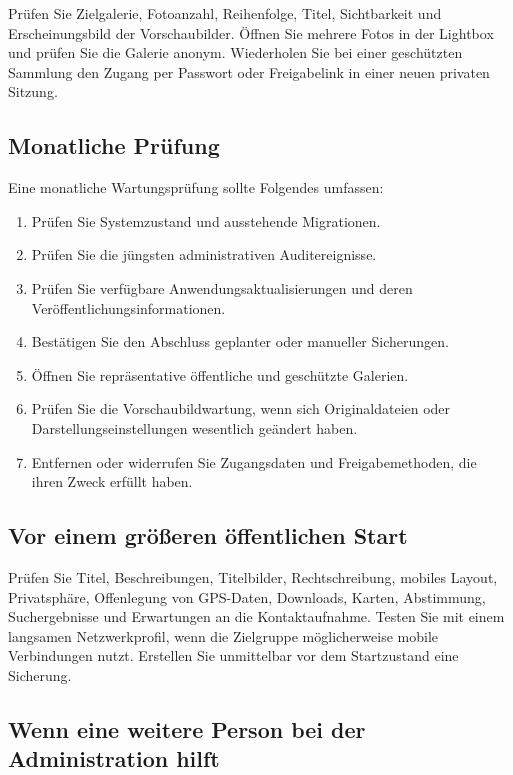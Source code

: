\documentclass[11pt,a4paper]{article}
\begin{document}
Prüfen Sie Zielgalerie, Fotoanzahl, Reihenfolge, Titel, Sichtbarkeit und
Erscheinungsbild der Vorschaubilder. Öffnen Sie mehrere Fotos in der Lightbox
und prüfen Sie die Galerie anonym. Wiederholen Sie bei einer geschützten
Sammlung den Zugang per Passwort oder Freigabelink in einer neuen privaten
Sitzung.

\subsection{Monatliche Prüfung}

Eine monatliche Wartungsprüfung sollte Folgendes umfassen:

\begin{enumerate}
  \item Prüfen Sie Systemzustand und ausstehende Migrationen.
  \item Prüfen Sie die jüngsten administrativen Auditereignisse.
  \item Prüfen Sie verfügbare Anwendungsaktualisierungen und deren
  Veröffentlichungsinformationen.
  \item Bestätigen Sie den Abschluss geplanter oder manueller Sicherungen.
  \item Öffnen Sie repräsentative öffentliche und geschützte Galerien.
  \item Prüfen Sie die Vorschaubildwartung, wenn sich Originaldateien oder
  Darstellungseinstellungen wesentlich geändert haben.
  \item Entfernen oder widerrufen Sie Zugangsdaten und Freigabemethoden, die
  ihren Zweck erfüllt haben.
\end{enumerate}

\subsection{Vor einem größeren öffentlichen Start}

Prüfen Sie Titel, Beschreibungen, Titelbilder, Rechtschreibung, mobiles Layout,
Privatsphäre, Offenlegung von GPS-Daten, Downloads, Karten, Abstimmung,
Suchergebnisse und Erwartungen an die Kontaktaufnahme. Testen Sie mit einem
langsamen Netzwerkprofil, wenn die Zielgruppe möglicherweise mobile Verbindungen
nutzt. Erstellen Sie unmittelbar vor dem Startzustand eine Sicherung.

\subsection{Wenn eine weitere Person bei der Administration hilft}
\end{document}
